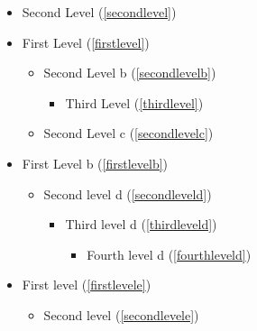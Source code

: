
\def\mytitle{Table of Contents}


\begin{itemize}

\item Second Level (\autoref{secondlevel})

\item First Level (\autoref{firstlevel})

\begin{itemize}

\item Second Level b (\autoref{secondlevelb})

\begin{itemize}

\item Third Level (\autoref{thirdlevel})

\end{itemize}

\item Second Level c (\autoref{secondlevelc})

\end{itemize}

\item First Level b (\autoref{firstlevelb})

\begin{itemize}

\item Second level d (\autoref{secondleveld})

\begin{itemize}

\item Third level d (\autoref{thirdleveld})

\begin{itemize}

\item Fourth level d (\autoref{fourthleveld})

\end{itemize}

\end{itemize}

\end{itemize}

\item First level  (\autoref{firstlevele})

\begin{itemize}

\item Second level  (\autoref{secondlevele})

\end{itemize}

\end{itemize}

